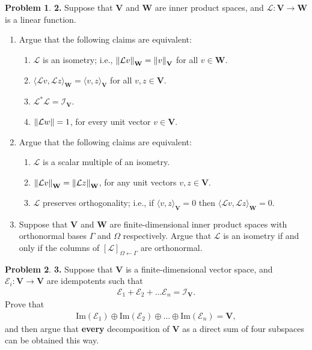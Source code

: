\documentclass{article}
\theoremstyle{definition}
\newtheorem*{prob*}{Problem}
\newcommand{\V}{\mathbf{V}}
\newcommand{\W}{\mathbf{W}}
\newcommand{\lag}{\mathcal{L}}
\newcommand{\E}{\mathcal{E}}
\newcommand{\ima}{\text{Im}}
\newcommand{\la}{\langle}
\newcommand{\ra}{\rangle}
\begin{document}
\begin{prob*}\textbf{2.} Suppose that $\V$ and $\W$ are inner product spaces, and $\lag : \V \to \W$ is a linear function. 
	\begin{enumerate}
		\item Argue that the following claims are equivalent:
		\begin{enumerate}
			\item $\lag$ is an isometry; i.e., $\norm{\lag v}_\W = \norm{v}_\V$ for all $v\in \W$.
			\item $\la \lag v, \lag z \ra_\W = \la v,z \ra_\V$ for all $v,z\in \V$.
			\item $\lag^*\lag = \mathcal{I}_\V$.
			\item $\norm{\lag w} = 1$, for every unit vector $v\in \V$.
		\end{enumerate}
	
	
	
		\item Argue that the following claims are equivalent:
		\begin{enumerate}
			\item $\lag$ is a scalar multiple of an isometry. 
			\item $\norm{\lag v}_\W = \norm{\lag z}_\W$, for any unit vectors $v,z\in \V$.
			\item $\lag$ preserves orthogonality; i.e., if $\la v,z\ra_\V = 0$ then $\la \lag v, \lag z \ra_\W = 0$. 
		\end{enumerate}
	
	
		\item Suppose that $\V$ and $\W$ are finite-dimensional inner product spaces with orthonormal bases $\Gamma$ and $\Omega$ respectively. Argue that $\lag$ is an isometry if and only if the columns of $[\lag]_{\Omega \leftarrow \Gamma}$ are orthonormal. 
	\end{enumerate}
	
\end{prob*}






\newpage



\begin{prob*}\textbf{3.} Suppose that $\V$ is a finite-dimensional vector space, and $\E_i: \V \to \V$ are idempotents such that
	\begin{align*}
	\E_1 + \E_2 + \dots \E_n = \mathcal{I}_\V.
	\end{align*}
	Prove that 
	\begin{align*}
	\ima(\E_1) \oplus \ima(\E_2) \oplus \dots \oplus \ima(\E_n) = \V,
	\end{align*}
	and then argue that \textbf{every} decomposition of $\V$ as a direct sum of four subspaces can be obtained this way.
	
	
\end{prob*}
\end{document}
